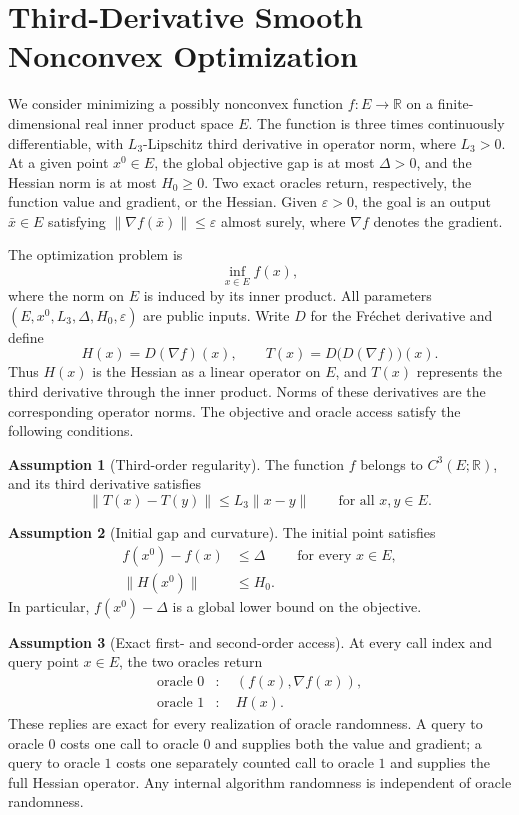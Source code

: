 \documentclass[10pt]{article}
\theoremstyle{definition}
\newtheorem{assumption}{Assumption}
\begin{document}
\section*{Third-Derivative Smooth Nonconvex Optimization}
We consider minimizing a possibly nonconvex function $f:E\to\mathbb{R}$ on a finite-dimensional real inner product space $E$. The function is three times continuously differentiable, with $L_3$-Lipschitz third derivative in operator norm, where $L_3>0$. At a given point $x^0\in E$, the global objective gap is at most $\Delta>0$, and the Hessian norm is at most $H_0\geq0$. Two exact oracles return, respectively, the function value and gradient, or the Hessian. Given $\varepsilon>0$, the goal is an output $\bar{x}\in E$ satisfying $\|\nabla f(\bar{x})\|\leq\varepsilon$ almost surely, where $\nabla f$ denotes the gradient.

The optimization problem is
\[
\inf_{x\in E} f(x),
\]
where the norm on $E$ is induced by its inner product. All parameters $(E,x^0,L_3,\Delta,H_0,\varepsilon)$ are public inputs. Write $D$ for the Fr\'echet derivative and define
\[
H(x)=D(\nabla f)(x),\qquad T(x)=D\bigl(D(\nabla f)\bigr)(x).
\]
Thus $H(x)$ is the Hessian as a linear operator on $E$, and $T(x)$ represents the third derivative through the inner product. Norms of these derivatives are the corresponding operator norms. The objective and oracle access satisfy the following conditions.

\begin{assumption}[Third-order regularity]
The function $f$ belongs to $C^3(E;\mathbb{R})$, and its third derivative satisfies
\[
\|T(x)-T(y)\|\leq L_3\|x-y\|
\qquad\text{for all }x,y\in E.
\]
\end{assumption}

\begin{assumption}[Initial gap and curvature]
The initial point satisfies
\[
\begin{aligned}
f(x^0)-f(x)&\leq\Delta &&\text{for every }x\in E,\\
\|H(x^0)\|&\leq H_0.
\end{aligned}
\]
In particular, $f(x^0)-\Delta$ is a global lower bound on the objective.
\end{assumption}

\begin{assumption}[Exact first- and second-order access]
At every call index and query point $x\in E$, the two oracles return
\[
\begin{aligned}
\text{oracle }0 &: \quad (f(x),\nabla f(x)),\\
\text{oracle }1 &: \quad H(x).
\end{aligned}
\]
These replies are exact for every realization of oracle randomness. A query to oracle $0$ costs one call to oracle $0$ and supplies both the value and gradient; a query to oracle $1$ costs one separately counted call to oracle $1$ and supplies the full Hessian operator. Any internal algorithm randomness is independent of oracle randomness.
\end{assumption}
\end{document}
